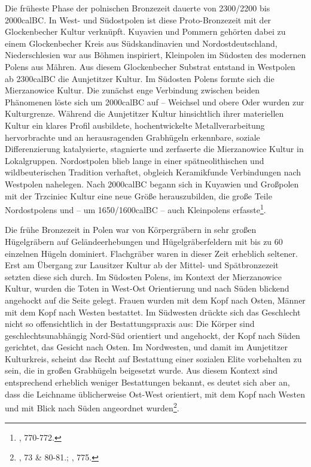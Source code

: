 \documentclass[openany,twoside,twocolumn]{book}
\let\rmarkdownfootnote\footnote%
\def\footnote{\protect\rmarkdownfootnote}
\begin{document}
Die früheste Phase der polnischen Bronzezeit dauerte von 2300/2200 bis
2000calBC. In West- und Südostpolen ist diese Proto-Bronzezeit mit der
Glockenbecher Kultur verknüpft. Kuyavien und Pommern gehörten dabei zu
einem Glockenbecher Kreis aus Südskandinavien und Nordostdeutschland,
Niederschlesien war aus Böhmen inspiriert, Kleinpolen im Südosten des
modernen Polens aus Mähren. Aus diesem Glockenbecher Substrat entstand
in Westpolen ab 2300calBC die Aunjetitzer Kultur. Im Südosten Polens
formte sich die Mierzanowice Kultur. Die zunächst enge Verbindung
zwischen beiden Phänomenen löste sich um 2000calBC auf -- Weichsel und
obere Oder wurden zur Kulturgrenze. Während die Aunjetitzer Kultur
hinsichtlich ihrer materiellen Kultur ein klares Profil ausbildete,
hochentwickelte Metallverarbeitung hervorbrachte und an herausragenden
Grabhügeln erkennbare, soziale Differenzierung katalysierte, stagnierte
und zerfaserte die Mierzanowice Kultur in Lokalgruppen. Nordostpolen
blieb lange in einer spätneolithischen und wildbeuterischen Tradition
verhaftet, obgleich Keramikfunde Verbindungen nach Westpolen nahelegen.
Nach 2000calBC begann sich in Kuyawien und Großpolen mit der Trzciniec
Kultur eine neue Größe herauszubilden, die große Teile Nordostpolens und
-- um 1650/1600calBC -- auch Kleinpolens erfasste\footnote{\textcite{czebreszuk_bronze_2013},
  770-772.}.

Die frühe Bronzezeit in Polen war von Körpergräbern in sehr großen
Hügelgräbern auf Geländeerhebungen und Hügelgräberfeldern mit bis zu 60
einzelnen Hügeln dominiert. Flachgräber waren in dieser Zeit erheblich
seltener. Erst am Übergang zur Lausitzer Kultur ab der Mittel- und
Spätbronzezeit setzten diese sich durch. Im Südosten Polens, im Kontext
der Mierzanowice Kultur, wurden die Toten in West-Ost Orientierung und
nach Süden blickend angehockt auf die Seite gelegt. Frauen wurden mit
dem Kopf nach Osten, Männer mit dem Kopf nach Westen bestattet. Im
Südwesten drückte sich das Geschlecht nicht so offensichtlich in der
Bestattungspraxis aus: Die Körper sind geschlechtsunabhängig Nord-Süd
orientiert und angehockt, der Kopf nach Süden gerichtet, das Gesicht
nach Osten. Im Nordwesten, und damit im Aunjetitzer Kulturkreis, scheint
das Recht auf Bestattung einer sozialen Elite vorbehalten zu sein, die
in großen Grabhügeln beigesetzt wurde. Aus diesem Kontext sind
entsprechend erheblich weniger Bestattungen bekannt, es deutet sich aber
an, dass die Leichname üblicherweise Ost-West orientiert, mit dem Kopf
nach Westen und mit Blick nach Süden angeordnet wurden\footnote{\textcite{dabrowski_aeltere_2004},
  73 \& 80-81.; \textcite{czebreszuk_bronze_2013}, 775.}.
\end{document}
